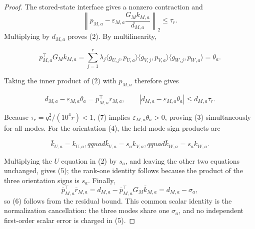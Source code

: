 \begin{lemma}
\begin{proof}
The stored-state interface gives a nonzero
contraction and
\[
\left\|p_{M,a}-\varepsilon_{M,a}
\frac{G_Mk_{M,a}}{d_{M,a}}\right\|_2\le\tau_r.
\]
Multiplying by $d_{M,a}$ proves (2).  By multilinearity,

\[
p_{M,a}^{\top}G_Mk_{M,a}
=\sum_{j=1}^r\lambda_j
\langle g_{U,j},p_{U,a}\rangle
\langle g_{V,j},p_{V,a}\rangle
\langle g_{W,j},p_{W,a}\rangle
=\theta_a.
\]

Taking the inner product of (2) with $p_{M,a}$ therefore gives

\[
d_{M,a}-\varepsilon_{M,a}\theta_a
=p_{M,a}^{\top}r_{M,a},
\qquad
|d_{M,a}-\varepsilon_{M,a}\theta_a|\le d_{M,a}\tau_r.
\tag{7}
\]

Because $\tau_r=q_*^2/(10^4r)<1$, (7) implies
$\varepsilon_{M,a}\theta_a>0$, proving (3) simultaneously for all modes.
For the orientation (4), the held-mode sign products are

\[
\bar k_{U,a}=k_{U,a},qquad
\bar k_{V,a}=s_ak_{V,a},qquad
\bar k_{W,a}=s_ak_{W,a}.
\]

Multiplying the $U$ equation in (2) by $s_a$, and leaving the other two
equations unchanged, gives (5); the rank-one identity follows because the
product of the three orientation signs is $s_a$.  Finally,
\[
\bar p_{M,a}^{\top}\bar r_{M,a}
=d_{M,a}-\bar p_{M,a}^{\top}G_M\bar k_{M,a}
=d_{M,a}-\sigma_a,
\]
so (6) follows from the residual bound.  This common scalar identity is the
normalization cancellation: the three modes share one $\sigma_a$, and no
independent first-order scalar error is charged in (5).  


\end{proof}
\end{lemma}
